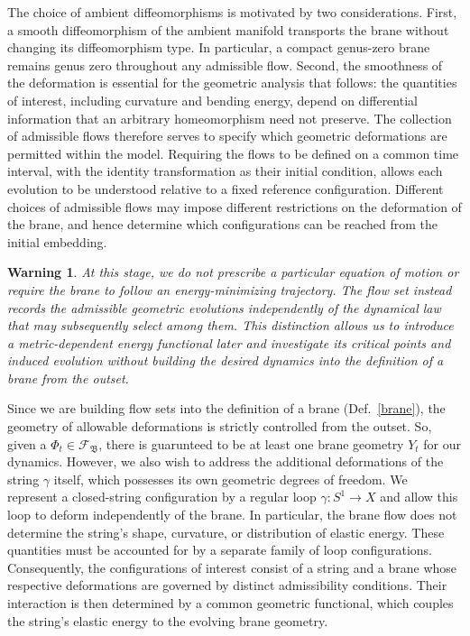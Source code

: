 \documentclass{article}
\newtheorem{war}{Warning}
\numberwithin{tm}{section}
\numberwithin{dn}{section}
\numberwithin{as}{section}
\numberwithin{rk}{section}
\numberwithin{lem}{section}
\numberwithin{ax}{section}
\numberwithin{pp}{section}
\numberwithin{eg}{section}
\numberwithin{war}{section}
\numberwithin{equation}{section}
\numberwithin{prop}{section}
\numberwithin{nt}{section}
\numberwithin{rc}{section}
\begin{document}
The choice of ambient diffeomorphisms is motivated by two considerations. First, a smooth diffeomorphism of the ambient manifold transports the brane without changing its diffeomorphism type. In particular, a compact genus-zero brane remains genus zero throughout any admissible flow. Second, the smoothness of the deformation is essential for the geometric analysis that follows: the quantities of interest, including curvature and bending energy, depend on differential information that an arbitrary homeomorphism need not preserve. The collection of admissible flows therefore serves to specify which geometric deformations are permitted within the model. Requiring the flows to be defined on a common time interval, with the identity transformation as their initial condition, allows each evolution to be understood relative to a fixed reference configuration. Different choices of admissible flows may impose different restrictions on the deformation of the brane, and hence determine which configurations can be reached from the initial embedding. 
\begin{war}
	At this stage, we do not prescribe a particular equation of motion or require the brane to follow an energy-minimizing trajectory. The flow set instead records the admissible geometric evolutions independently of the dynamical law that may subsequently select among them. This distinction allows us to introduce a metric-dependent energy functional later and investigate its critical points and induced evolution without building the desired dynamics into the definition of a brane from the outset.
\end{war}

Since we are building flow sets into the definition of a brane (Def.~\ref{brane}), the geometry of allowable deformations is strictly controlled from the outset. So, given a $\Phi_t \in \mathscr{F}_\mathfrak{B}$, there is guarunteed to be at least one brane geometry $Y_t$ for our dynamics. However, we also wish to address the additional deformations of the string $\gamma$ itself, which possesses its own geometric degrees of freedom. We represent a closed-string configuration by a regular loop $\gamma:S^1\to X$ and allow this loop to deform independently of the brane. In particular, the brane flow does not determine the string's shape, curvature, or distribution of elastic energy. These quantities must be accounted for by a separate family of loop configurations. Consequently, the configurations of interest consist of a string and a brane whose respective deformations
are governed by distinct admissibility conditions. Their interaction is then determined by a common
geometric functional, which couples the string's elastic energy to the evolving brane geometry.
\end{document}
